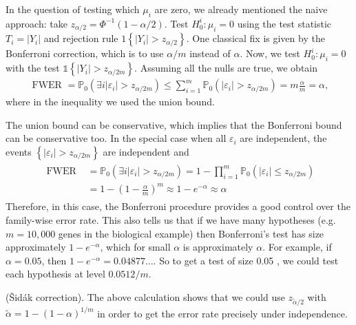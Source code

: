 In the question of testing which $\mu_i$ are zero, we already mentioned the naive approach: take $z_{\alpha / 2}=\Phi^{-1}(1-\alpha / 2)$. Test $H_0^i: \mu_i=0$ using the test statistic $T_i=\left|Y_i\right|$ and rejection rule $1\left\{\left|Y_i\right|>z_{\alpha / 2}\right\}$. One classical fix is given by the Bonferroni correction, which is to use $\alpha / m$ instead of $\alpha$. Now, we test $H_0^i: \mu_i=0$ with the test $\mathbb{1}\left\{\left|Y_i\right|>z_{\alpha / 2 m}\right\}$. Assuming all the nulls are true, we obtain
\begin{align*}
\text { FWER }=\mathbb{P}_0\left(\exists i\left|\varepsilon_i\right|>z_{\alpha / 2 m}\right) \leq \sum_{i=1}^m \mathbb{P}_0\left(\left|\varepsilon_i\right|>z_{\alpha / 2 m}\right)=m \frac{\alpha}{m}=\alpha,
\end{align*}
where in the inequality we used the union bound. 
\begin{remark}
    The union bound can be conservative, which implies that the Bonferroni bound can be conservative too. In the special case when all $\varepsilon_i$ are independent, the events $\left\{\left|\varepsilon_i\right|>z_{\alpha / 2 m}\right\}$ are independent and
\begin{align*}
\begin{aligned}
\text { FWER } & =\mathbb{P}_0\left(\exists i\left|\varepsilon_i\right|>z_{\alpha / 2 m}\right)=1-\prod_{i=1}^m \mathbb{P}_0\left(\left|\varepsilon_i\right| \leq z_{\alpha / 2 m}\right) \\
& =1-\left(1-\frac{\alpha}{m}\right)^m \approx 1-e^{-\alpha} \approx \alpha
\end{aligned}
\end{align*}
Therefore, in this case, the Bonferroni procedure provides a good control over the family-wise error rate. This also tells us that if we have many hypotheses (e.g. $m=10,000$ genes in the biological example) then Bonferroni's test has size approximately $1-e^{-\alpha}$, which for small $\alpha$ is approximately $\alpha$. For example, if $\alpha=0.05$, then $1-e^{-\alpha}=0.04877 \ldots$. So to get a test of size 0.05 , we could test each hypothesis at level $0.0512 / m$.
\end{remark}




\begin{remark}
    (Šidák correction). The above calculation shows that we could use $z_{\tilde{\alpha} / 2}$ with $\tilde{\alpha}=1-(1-\alpha)^{1 / m}$ in order to get the error rate precisely under independence.
\end{remark}



